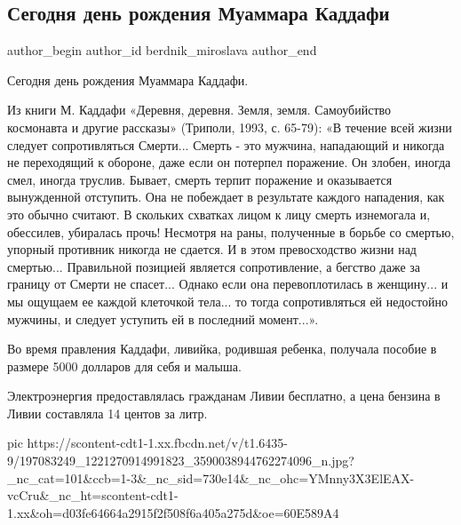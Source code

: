  
 
 
 
 
 
\subsection{Сегодня день рождения Муаммара Каддафи}
\label{sec:07_06_2021.fb.berdnik_miroslava.5.kaddafi_birthday}
\ifcmt
 author_begin
   author_id berdnik_miroslava
 author_end
\fi

Сегодня день рождения Муаммара Каддафи.

Из книги М. Каддафи «Деревня, деревня. Земля, земля. Самоубийство космонавта и
другие рассказы» (Триполи, 1993, с. 65-79): «В течение всей жизни следует
сопротивляться Смерти... Смерть - это мужчина, нападающий и никогда не
переходящий к обороне, даже если он потерпел поражение. Он злобен, иногда смел,
иногда труслив. Бывает, смерть терпит поражение и оказывается вынужденной
отступить. Она не побеждает в результате каждого нападения, как это обычно
считают. В скольких схватках лицом к лицу смерть изнемогала и, обессилев,
убиралась прочь! Несмотря на раны, полученные в борьбе со смертью, упорный
противник никогда не сдается. И в этом превосходство жизни над смертью...
Правильной позицией является сопротивление, а бегство даже за границу от Смерти
не спасет... Однако если она перевоплотилась в женщину... и мы ощущаем ее каждой
клеточкой тела... то тогда сопротивляться ей недостойно мужчины, и следует
уступить ей в последний момент...».

Во время правления Каддафи, ливийка, родившая ребенка, получала пособие в размере 5000 долларов для себя и малыша.

Электроэнергия предоставлялась гражданам Ливии бесплатно, а цена бензина в Ливии составляла 14 центов за литр.

\ifcmt
  pic https://scontent-cdt1-1.xx.fbcdn.net/v/t1.6435-9/197083249_1221270914991823_3590038944762274096_n.jpg?_nc_cat=101&ccb=1-3&_nc_sid=730e14&_nc_ohc=YMnny3X3ElEAX-vcCru&_nc_ht=scontent-cdt1-1.xx&oh=d03fe64664a2915f2f508f6a405a275d&oe=60E589A4
\fi


